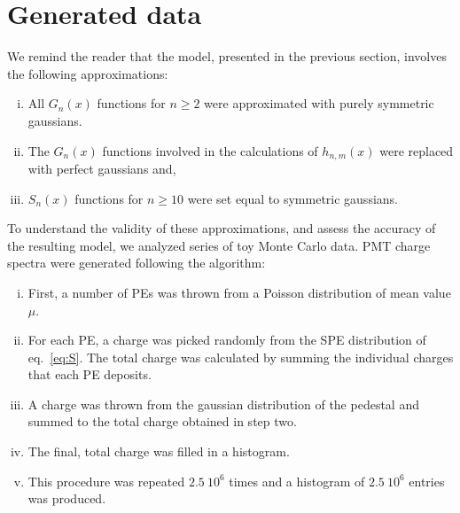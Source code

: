 \documentclass[preprint,12pt]{elsarticle}
\begin{document}
\section{Generated data}
\label{sec:sim}

We remind the reader that the model, presented in the previous section, involves the following approximations:
\begin{enumerate}[i.]
\item All $G_n(x)$ functions for $n \geq 2$ were approximated with purely symmetric gaussians.
\item The $G_n(x)$ functions involved in the calculations of $h_{n,m}(x)$ were replaced with perfect gaussians and,  
\item $S_n(x)$ functions for $n\geq10$ were set equal to symmetric gaussians. 
\end{enumerate}
To understand the validity of these approximations, and assess the accuracy of the resulting model, we analyzed series of toy Monte Carlo data.  
PMT charge spectra were generated following the algorithm:
\begin{enumerate}[i.]
\item First, a number of PEs was thrown from a Poisson distribution of mean value $\mu$. 
\item For each PE, a charge was picked randomly from the SPE distribution of eq.~\eqref{eq:S}.
The total charge was calculated by summing the individual charges that each PE deposits.
\item A charge was thrown from the gaussian distribution of the pedestal and summed to the total charge obtained in step two.
\item The final, total charge was filled in a histogram.
\item This procedure was repeated $2.5\ 10^6$ times and a histogram of $2.5\ 10^6$ entries was produced.
\end{enumerate}
\end{document}
